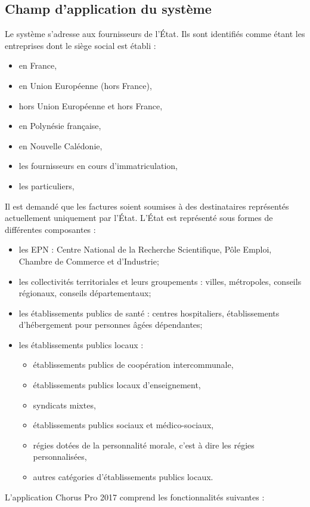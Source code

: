 \documentclass[12pt,a4paper]{article}
\begin{document}
\subsection{Champ d'application du système}
Le système s'adresse aux fournisseurs de l'État. Ils sont identifiés comme étant les entreprises dont le siège social est établi :
\begin{itemize}
\item en France,
\item en Union Européenne (hors France),
\item hors Union Européenne et hors France,
\item en Polynésie française,
\item en Nouvelle Calédonie,
\item les fournisseurs en cours d’immatriculation,
\item les particuliers,
\end{itemize}
Il est demandé que les factures soient soumises à des destinataires représentés actuellement uniquement par l'État. L'État est représenté sous formes de différentes composantes :
\begin{itemize}
\item les \gls{EPN} : Centre National de la Recherche Scientifique, Pôle Emploi, Chambre de Commerce et d'Industrie;
\item les collectivités territoriales et leurs groupements : villes, métropoles, conseils
régionaux, conseils départementaux;
\item les établissements publics de santé : centres hospitaliers, établissements d'hébergement pour personnes âgées dépendantes;
\item les établissements publics locaux :
\begin{itemize}
\item établissements publics de coopération intercommunale,
\item établissements publics locaux d’enseignement,
\item syndicats mixtes,
\item établissements publics sociaux et médico-sociaux,
\item régies dotées de la personnalité morale, c’est à dire les régies personnalisées,
\item autres catégories d’établissements publics locaux.
\end{itemize}
\end{itemize}
\newpage
L'application Chorus Pro 2017 comprend les fonctionnalités suivantes :
\end{document}
